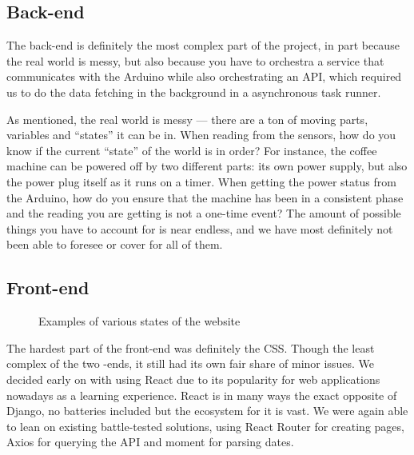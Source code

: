 \documentclass[12pt,a4paper,oneside,article]{memoir}
\numberwithin{equation}{chapter}
\begin{document}
\subsection{Back-end}\label{sec:back-end}
The back-end is definitely the most complex part of the project, in part because
the real world is messy, but also because you have to orchestra a service that
communicates with the Arduino while also orchestrating an API, which required 
us to do the data fetching in the background in a asynchronous task runner.

As mentioned, the real world is messy --- there are a ton of moving parts,
variables and ``states'' it can be in. When reading from the sensors, how do you
know if the current ``state'' of the world is in order? For instance, the coffee
machine can be powered off by two different parts: its own power supply, but
also the power plug itself as it runs on a timer. When getting the power status
from the Arduino, how do you ensure that the machine has been in a consistent
phase and the reading you are getting is not a one-time event? The amount of
possible things you have to account for is near endless, and we have most
definitely not been able to foresee or cover for all of them.

\subsection{Front-end}\label{sec:front-end}
\begin{figure}[ht]
  \centerfloat
  \caption{Examples of various states of the website}\label{fig:website}
\end{figure}
The hardest part of the front-end was definitely the CSS. Though the least
complex of the two -ends, it still had its own fair share of minor issues. We
decided early on with using React due to its popularity for web applications
nowadays as a learning experience. React is in many ways the exact opposite of
Django, no batteries included but the ecosystem for it is vast. We were again
able to lean on existing battle-tested solutions, using React Router for
creating pages, Axios for querying the API and moment for parsing dates.
\end{document}
